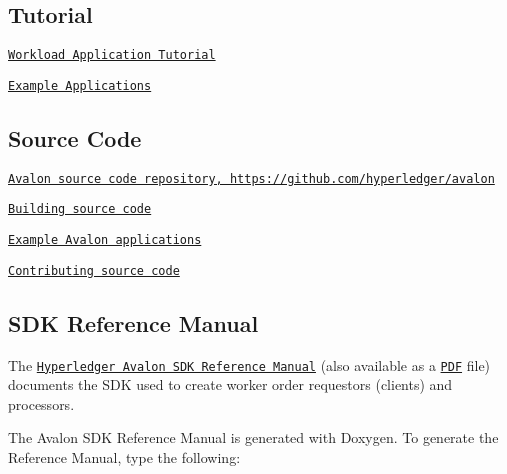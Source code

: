 \subsection*{Tutorial}


\begin{DoxyItemize}
\item \href{https://github.com/hyperledger/avalon/blob/master/docs//workload-tutorial/}{\tt Workload Application Tutorial}
\item \href{https://github.com/hyperledger/avalon/blob/master/examples/apps/}{\tt Example Applications}
\end{DoxyItemize}

\subsection*{Source Code}


\begin{DoxyItemize}
\item \href{https://github.com/hyperledger/avalon}{\tt Avalon source code repository, https\+://github.\+com/hyperledger/avalon}
\item \href{https://github.com/hyperledger/avalon/blob/master/BUILD.m%64}{\tt Building source code}
\item \href{https://github.com/hyperledger/avalon/blob/master/examples/apps/}{\tt Example Avalon applications}
\item \href{https://github.com/hyperledger/avalon/blob/master/CONTRIBUTING.m%64}{\tt Contributing source code}
\end{DoxyItemize}

\subsection*{S\+DK Reference Manual}

The \href{https://danintel.github.io/refman.pdf}{\tt Hyperledger Avalon S\+DK Reference Manual} (also available as a \href{https://danintel.github.io/refman.pdf}{\tt P\+DF} file) documents the S\+DK used to create worker order requestors (clients) and processors.

The Avalon S\+DK Reference Manual is generated with Doxygen. To generate the Reference Manual, type the following\+: 


